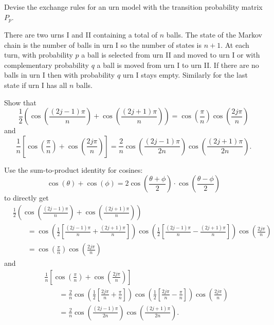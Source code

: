 \documentclass[12pt]{article}
\begin{document}
\begin{exercise}
    Devise the exchange rules for an urn model with the transition
    probability matrix \( P_{p} \).
\end{exercise}
\begin{solution}
    There are two urns I and II containing a total of \( n \) balls.
    The state of the Markov chain is the number of balls in urn I so the
    number of states is \( n+1 \).  At each turn, with probability \( p \)
    a ball is selected from urn II and moved to urn I or with
    complementary probability \( q \) a ball is moved from urn I to urn
    II\@. If there are no balls in urn I then with probability \( q \)
    urn I stays empty.  Similarly for the last state if urn I has all \(
    n \) balls.
\end{solution}
\begin{exercise}
    Show that
    \[
        \frac{1}{2} \left( \cos\left( \frac{(2j-1)\pi }{n } \right) +
        \cos\left( \frac{(2j+1)\pi }{n } \right) \right) = \cos\left(
        \frac{\pi}{n} \right) \cos\left( \frac{2 j \pi}{n} \right)
    \] and
    \[
        \frac{1}{n} \left[ \cos\left( \frac{\pi}{n} \right) + \cos\left(
        \frac{2j\pi}{n} \right) \right] = \frac{2}{n} \cos\left( \frac{(2j
        - 1) \pi }{2n} \right) \cos\left( \frac{(2j+1) \pi }{2n} \right).
    \]
\end{exercise}
\begin{solution}
    Use the sum-to-product identity for cosines:
    \[
        \cos( \theta) + \cos(\phi) = 2 \cos \left( \frac{\theta + \phi}{2}
        \right) \cdot \cos \left( \frac{\theta - \phi}{2} \right)
    \] to directly get
    \begin{align*}
        &\frac{1}{2} \left( \cos\left( \frac{(2j-1)\pi }{n } \right) +
        \cos\left( \frac{(2j+1)\pi }{n } \right) \right) \\
        &\qquad = \cos\left( \frac{1}{2} \left[ \frac{(2j-1)\pi}{n} +
        \frac{(2j+1)\pi}{n}\right] \right) \cos\left( \frac{1}{2} \left[
        \frac{(2j-1)\pi}{n} - \frac{(2j+1)\pi}{n}\right]\right)\cos\left
        (\frac{2j\pi}{n}\right)\\
        &\qquad = \cos\left( \frac{\pi}{n} \right) \cos\left( \frac{2 j
        \pi}{n} \right)
    \end{align*}
    and
    \begin{align*}
        &\frac{1}{n} \left[ \cos\left( \frac{\pi}{n} \right) + \cos\left
        ( \frac{2j\pi}{n} \right) \right] \\
        &\qquad = \frac{2}{n} \cos\left( \frac{1}{2} \left[ \frac{2j\pi}
        {n} + \frac{\pi}{n}\right] \right) \cos\left( \frac{1}{2} \left[
        \frac{2j\pi}{n} - \frac{\pi}{n}\right]\right) \cos\left(\frac{2j\pi}
        {n}\right)\\
        &\qquad = \frac{2}{n} \cos\left( \frac{(2j - 1) \pi }{2n} \right)
        \cos\left( \frac{(2j+1) \pi }{2n} \right).
    \end{align*}
\end{solution}
\end{document}
